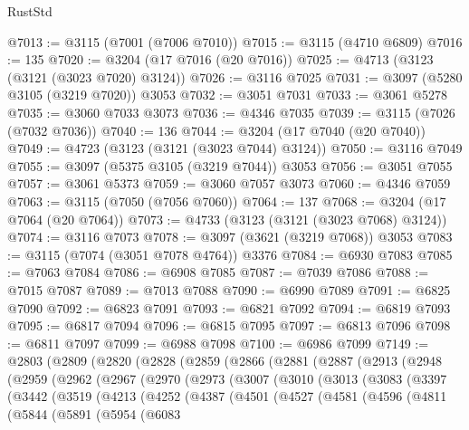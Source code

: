 \begin{lexlean}{RustStd}
\begin{coremodule}
@7013 := @3115 (@7001 (@7006 @7010))
@7015 := @3115 (@4710 @6809)
@7016 := 135
@7020 := @3204 (@17 @7016 (@20 @7016))
@7025 := @4713 (@3123 (@3121 (@3023 @7020) @3124))
@7026 := @3116 @7025
@7031 := @3097 (@5280 @3105 (@3219 @7020)) @3053
@7032 := @3051 @7031
@7033 := @3061 @5278
@7035 := @3060 @7033 @3073
@7036 := @4346 @7035
@7039 := @3115 (@7026 (@7032 @7036))
@7040 := 136
@7044 := @3204 (@17 @7040 (@20 @7040))
@7049 := @4723 (@3123 (@3121 (@3023 @7044) @3124))
@7050 := @3116 @7049
@7055 := @3097 (@5375 @3105 (@3219 @7044)) @3053
@7056 := @3051 @7055
@7057 := @3061 @5373
@7059 := @3060 @7057 @3073
@7060 := @4346 @7059
@7063 := @3115 (@7050 (@7056 @7060))
@7064 := 137
@7068 := @3204 (@17 @7064 (@20 @7064))
@7073 := @4733 (@3123 (@3121 (@3023 @7068) @3124))
@7074 := @3116 @7073
@7078 := @3097 (@3621 (@3219 @7068)) @3053
@7083 := @3115 (@7074 (@3051 @7078 @4764)) @3376
@7084 := @6930 @7083
@7085 := @7063 @7084
@7086 := @6908 @7085
@7087 := @7039 @7086
@7088 := @7015 @7087
@7089 := @7013 @7088
@7090 := @6990 @7089
@7091 := @6825 @7090
@7092 := @6823 @7091
@7093 := @6821 @7092
@7094 := @6819 @7093
@7095 := @6817 @7094
@7096 := @6815 @7095
@7097 := @6813 @7096
@7098 := @6811 @7097
@7099 := @6988 @7098
@7100 := @6986 @7099
@7149 := @2803
    (@2809
      (@2820
        (@2828
          (@2859
            (@2866
              (@2881
                (@2887
                  (@2913
                    (@2948
                      (@2959
                        (@2962
                          (@2967
                            (@2970
                              (@2973
                                (@3007
                                  (@3010
                                    (@3013
                                      (@3083
                                        (@3397
                                          (@3442
                                            (@3519
                                              (@4213
                                                (@4252
                                                  (@4387
                                                    (@4501
                                                      (@4527
                                                        (@4581
                                                          (@4596
                                                            (@4811
                                                              (@5844
                                                                (@5891
                                                                  (@5954
                                                                    (@6083

\end{coremodule}
\end{lexlean}
